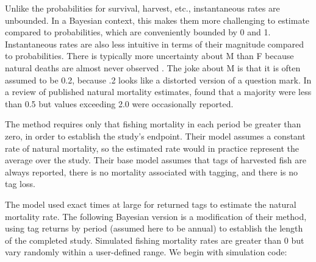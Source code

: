 \documentclass[
]{krantz}
\begin{document}
Unlike the probabilities for survival, harvest, etc., instantaneous rates are unbounded. In a Bayesian context, this makes them more challenging to estimate compared to probabilities, which are conveniently bounded by 0 and 1. Instantaneous rates are also less intuitive in terms of their magnitude compared to probabilities. There is typically more uncertainty about M than F because natural deaths are almost never observed \citep{hearn.etal1987, quinn.deriso_1999}. The joke about M is that it is often assumed to be 0.2, because .2 looks like a distorted version of a question mark. In a review of published natural mortality estimates, \citet{vetter_1988} found that a majority were less than 0.5 but values exceeding 2.0 were occasionally reported.

The \citet{hearn.etal1987} method requires only that fishing mortality in each period be greater than zero, in order to establish the study's endpoint. Their model assumes a constant rate of natural mortality, so the estimated rate would in practice represent the average over the study. Their base model assumes that tags of harvested fish are always reported, there is no mortality associated with tagging, and there is no tag loss.

The \citet{hearn.etal1987} model used exact times at large for returned tags to estimate the natural mortality rate. The following Bayesian version is a modification of their method, using tag returns by period (assumed here to be annual) to establish the length of the completed study. Simulated fishing mortality rates are greater than 0 but vary randomly within a user-defined range. We begin with simulation code:
\end{document}
